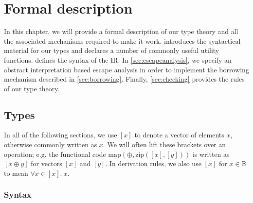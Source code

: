 \chapter{Formal description}\label{sec:theory}

In this chapter, we will provide a formal description of our type theory and all the associated mechanisms required to make it work.  introduces the syntactical material for our types and declares a number of commonly useful utility functions.  defines the syntax of the IR. In \cref{sec:escapeanalysis}, we specify an abstract interpretation based escape analysis in order to implement the borrowing mechanism described in \cref{sec:borrowing}. Finally, \cref{sec:checking} provides the rules of our type theory.

\newcommand{\sep}{\ \ |\ \ }
\newcommand{\icode}[1]{\textrm{\lstinline[language=ir-if]|#1|}}

\section{Types}\label{sec:types}
In all of the following sections, we use $[x]$ to denote a vector of elements $x$, otherwise commonly written as $\overline{x}$. We will often lift these brackets over an operation; e.g. the functional code $\mathrm{map}(\oplus, \mathrm{zip}([x], [y]))$ is written as $[x \oplus y]$ for vectors $[x]$ and $[y]$. In derivation rules, we also use $[x]$ for $x \in \mathbb{B}$ to mean $\forall x \in [x].\ x$.

\subsection{Syntax}

\newcommand{\dom}{\mathrm{dom}}
\newcommand{\Var}{\mathrm{Var}}
\newcommand{\Ctor}{\mathrm{Ctor}}
\newcommand{\Proj}{\mathrm{Proj}}
\newcommand{\Const}{\mathrm{Const}}
\newcommand{\Attr}{\mathrm{Attr}}
\newcommand{\ADT}{\mathrm{ADT}}
\newcommand{\adt}{\mathrm{adt}}
\newcommand{\field}{\mathrm{field}}
\newcommand{\ADTConst}{\mathrm{ADTConst}}
\newcommand{\AttrType}{\mathrm{AttrType}}
\newcommand{\arrg}{\mathrm{arg}}
\newcommand{\param}{\mathrm{param}}
\newcommand{\ret}{\mathrm{ret}}
\newcommand{\ADTDecls}{\mathrm{ADTDecls}}
\newcommand{\FunTypes}{\mathrm{FunTypes}}

